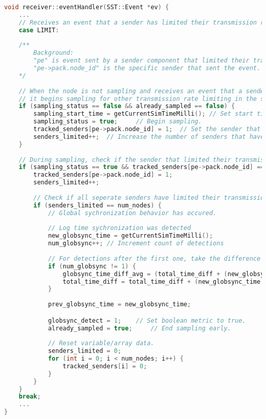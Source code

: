\documentclass{article}
\begin{document}
\begin{lstlisting}[language=C++, commentstyle=\fontfamily{fve}\selectfont\color{black}]
void receiver::eventHandler(SST::Event *ev) {
	...
	// Receives an event that a sender has limited their transmission rates.
	case LIMIT: 
	
	/** 
		Background: 
		"pe" is event sent by a sender component that limited their transmission rate.
		"pe->pack.node_id" is the specific sender that sent the event.
	*/
	
	// When the node is not sampling and receives an event that a sender is limiting transmission rates,
	// it begins sampling for other transmission rate limiting in the set window time.
	if (sampling_status == false && already_sampled == false) {
		sampling_start_time = getCurrentSimTimeMilli(); // Set start time of sampling.
		sampling_status = true;		// Begin sampling.
		tracked_senders[pe->pack.node_id] = 1;	// Set the sender that caused sampling to begin to
		senders_limited++;	// Increase the number of senders that have limited their transmission rates.
	} 
	
	// During sampling, check if the sender that limited their transmission rate is new, and that sampling has not already ended early (behavior has already been detected in sampling window).
	if (sampling_status == true && tracked_senders[pe->pack.node_id] == 0 && already_sampled == false) {
		tracked_senders[pe->pack.node_id] = 1;
		senders_limited++; 
		
		// Check if all seperate senders have limited their transmission rates in the sampling window time.
		if (senders_limited == num_nodes) {
			// Global sychronization behavior has occured.
			
			// Log time sychronization was detected
			new_globsync_time = getCurrentSimTimeMilli();
			num_globsync++; // Increment count of detections
			
			// For detections after the first one, take the difference in times between detection points and average them.
			if (num_globsync != 1) { 
				globsync_time_diff_avg = (total_time_diff + (new_globsync_time - prev_globsync_time)) / (num_globsync - 1); 
				total_time_diff = total_time_diff + (new_globsync_time - prev_globsync_time);
			} 
			
			prev_globsync_time = new_globsync_time;

			globsync_detect = 1;	// Set boolean metric to true.
			already_sampled = true;		// End sampling early.
			
			// Reset variable/array data.
			senders_limited = 0;
			for (int i = 0; i < num_nodes; i++) {
				tracked_senders[i] = 0;
			}
		}
	} 
	break;
	...
}
\end{lstlisting}
													
\end{document}
